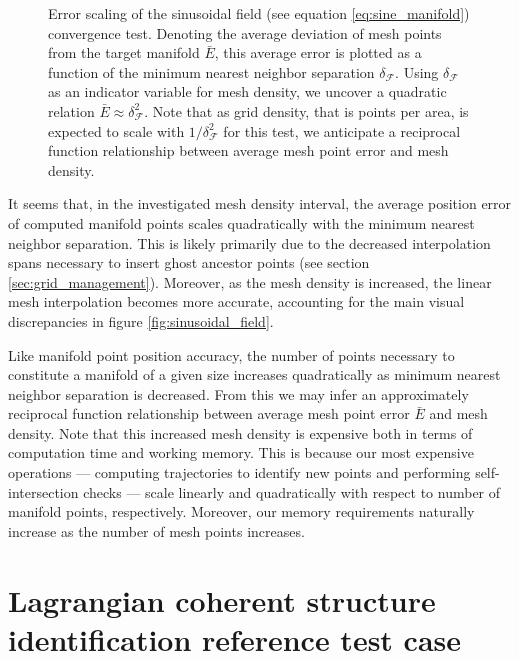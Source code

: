 \begin{figure}[h!]
\label{fig:sinusoidal_errorscaling}
\centering
\resizebox{0.9\textwidth}{!}{}
\caption{Error scaling of the sinusoidal field (see equation \eqref{eq:sine_manifold}) convergence test. Denoting the average deviation of mesh points from the target manifold $\bar{E}$, this average error is plotted as a function of the minimum nearest neighbor separation $\delta_{\mathcal{F}}$. Using $\delta_{\mathcal{F}}$ as an indicator variable for mesh density, we uncover a quadratic relation $\bar{E}\approx \delta_{\mathcal{F}}^2$. Note that as grid density, that is points per area, is expected to scale with $1/\delta_\mathcal{F}^2$ for this test, we anticipate a reciprocal function relationship between average mesh  point error and mesh density.}\label{fig:sinusoidal_errorscaling}
\end{figure}

It seems that, in the investigated mesh density interval, the average position error of computed manifold points scales quadratically with the minimum nearest neighbor separation. This is likely primarily due to the decreased interpolation spans necessary to insert ghost ancestor points (see section \ref{sec:grid_management}). Moreover, as the mesh density is increased, the linear mesh interpolation becomes more accurate, accounting for the main visual discrepancies in figure \ref{fig:sinusoidal_field}.

Like manifold point position accuracy, the number of points necessary to constitute a manifold of a given size increases quadratically as minimum nearest neighbor separation is decreased. From this we may infer an approximately reciprocal function relationship between average mesh point error $\bar{E}$ and mesh density. Note that this increased mesh density is expensive both in terms of computation time and working memory. This is because our most expensive operations --- computing trajectories to identify new points and performing self-intersection checks --- scale linearly and quadratically with respect to number of manifold points, respectively. Moreover, our memory requirements naturally increase as the number of mesh points increases. 

\section{Lagrangian coherent structure identification reference test case}\label{sec:LCS_test_cases}

